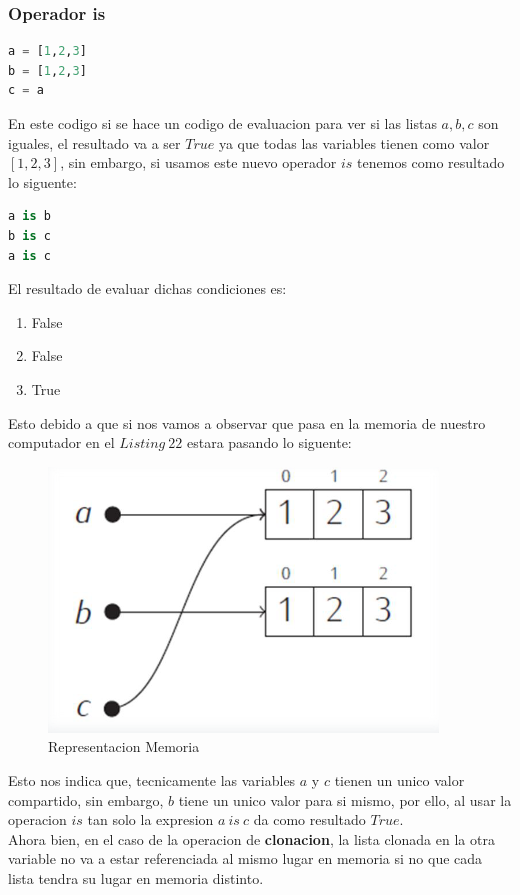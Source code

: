 \documentclass{article}
\begin{document}
\subsubsection{Operador is}
\begin{lstlisting}[language=Python, caption= Eliminacion de elementos de Listas]
a = [1,2,3]
b = [1,2,3]
c = a
\end{lstlisting}
En este codigo si se hace un codigo de evaluacion para ver si las listas \(a,b,c\) son iguales, el resultado va a ser \(True\) ya que todas las variables tienen como valor \([1,2,3]\), sin embargo, si usamos este nuevo operador \(is\) tenemos como resultado lo siguente:
\begin{lstlisting}[language=Python, caption= Operador is en Listas]
a is b
b is c
a is c
\end{lstlisting}
El resultado de evaluar dichas condiciones es:
\begin{enumerate}
    \item False
    \item False
    \item True
\end{enumerate}
Esto debido a que si nos vamos a observar que pasa en la memoria de nuestro computador en el \(Listing \ 22\) estara pasando lo siguente: 
\begin{figure}[H]
    \centering
    \includegraphics[width=.5\linewidth]{MemoryOperationIs.png}
    \caption{Representacion Memoria}
    \label{fig:enter-label}
\end{figure}
Esto nos indica que, tecnicamente las variables \(a\) y \(c\) tienen un unico valor compartido, sin embargo, \(b\) tiene un unico valor para si mismo, por ello, al usar la operacion \(is\) tan solo la expresion \(a \ is \ c\) da como resultado \(True\).\\
Ahora bien, en el caso de la operacion de \textbf{clonacion}, la lista clonada en la otra variable no va a estar referenciada al mismo lugar en memoria si no que cada lista tendra su lugar en memoria distinto.
\end{document}
